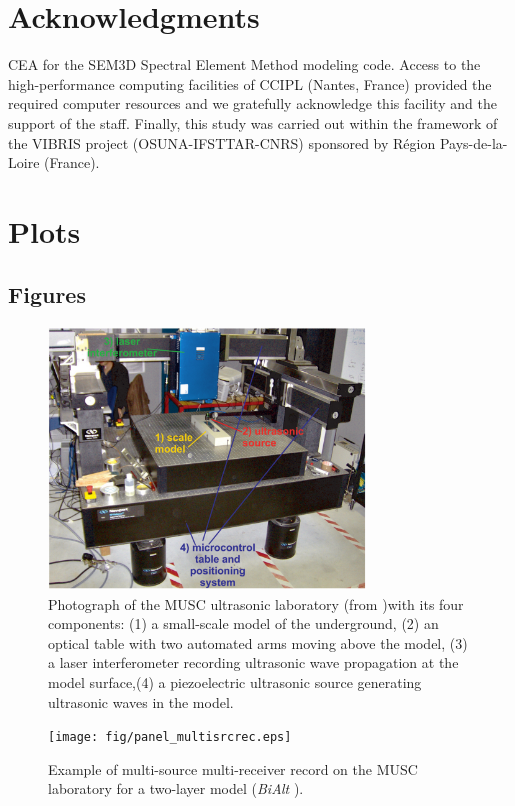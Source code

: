 \documentclass[manuscript,revised]{geophysics}
\newcommand{\bialt}{\textit{BiAlt} }
\begin{document}
\section*{Acknowledgments}

\noindent CEA for the SEM3D Spectral Element Method modeling code. Access to the high-performance computing facilities of CCIPL (Nantes, France) provided the required computer resources and we gratefully acknowledge this facility and the support of the staff. Finally, this study was carried out within the framework of the VIBRIS project (OSUNA-IFSTTAR-CNRS) sponsored by R\'egion Pays-de-la-Loire (France).   

\section{Plots}

\subsection*{Figures}

\begin{figure}[!h]
	\centering
	\includegraphics[width=0.75\textwidth]{fig/panel_musc_bench.eps}
	\caption{Photograph of the MUSC ultrasonic laboratory (from \citet{Bretaudeau_FWI_2013} )with its four components: (1) a small-scale model of the underground, (2) an optical table with two automated arms moving above the model, (3) a laser interferometer recording ultrasonic wave propagation	at the model surface,(4) a piezoelectric ultrasonic source generating ultrasonic waves in the model.}
	\label{panel_musc_bench}
\end{figure}

\begin{figure}[!h]
	\centering
	\texttt{[image: fig/panel\_multisrcrec.eps]}
	\caption{Example of multi-source multi-receiver record on the MUSC laboratory for a two-layer model (\bialt).}
	\label{panel_multisrcrec}
\end{figure}
\end{document}
